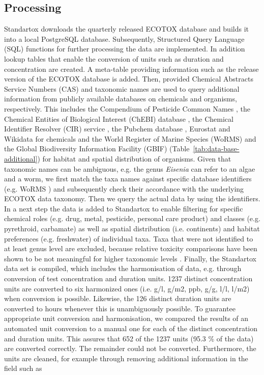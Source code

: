 \documentclass[journal,datadescriptor,submit,moreauthors,pdftex]{Definitions/mdpi}
\begin{document}
\subsection{Processing}
Standartox downloads the quarterly released ECOTOX database and builds it into a local PostgreSQL database. Subsequently, Structured Query Language (SQL) functions for further processing the data are implemented. In addition lookup tables that enable the conversion of units such as duration and concentration are created. A meta-table providing information such as the release version of the ECOTOX database is added. Then, provided Chemical Abstracts Service Numbers (CAS) and taxonomic names are used to query additional information from publicly available databases on chemicals and organisms, respectively. This includes the Compendium of Pesticide Common Names \citep{wood_compendium_2019}, the Chemical Entities of Biological Interest (ChEBI) database \citep{hastings_chebi_2016}, the Chemical Identifier Resolver (CIR) service \citep{nationalinstitutesofhealthnih_chemical_2019}, the Pubchem database \citep{kim_pubchem_2016}, Eurostat \citep{europeancommission_eurostat_2019} and Wikidata \citep{vrandecic_wikidata_2014} for chemicals and the World Register of Marine Species (WoRMS) \citep{wormseditorialboard_world_2020} and the Global Biodiversity Information Facility (GBIF) \citep{gbiftheglobalbiodiversityinformationfacility_what_2020} (Table~\ref{tab:data-base-additional}) for habitat and spatial distribution of organisms. Given that taxonomic names can be ambiguous, e.g. the genus \textit{Eisenia} can refer to an algae and a worm, we first match the taxa names against specific database identifiers (e.g. WoRMS \citep{wormseditorialboard_world_2020}) and subsequently check their accordance with the underlying ECOTOX data taxonomy. Then we query the actual data by using the identifiers. In a next step the data is added to Standartox to enable filtering for specific chemical roles (e.g. drug, metal, pesticide, personal care product) and classes (e.g. pyrethroid, carbamate) as well as spatial distribution (i.e. continents) and habitat preferences (e.g. freshwater) of individual taxa. Taxa that were not identified to at least genus level are excluded, because relative toxicity comparisons have been shown to be not meaningful for higher taxonomic levels \citep{rainbow_trace_2002, buchwalter_differences_2005, malaj_physiological_2012}. Finally, the Standartox data set is compiled, which includes the harmonisation of data, e.g. through conversion of test concentration and duration units. 1237 distinct concentration units are converted to six harmonized ones (i.e. g/l, g/m2, ppb, g/g, l/l, l/m2) when conversion is possible. Likewise, the 126 distinct duration units are converted to hours whenever this is unambiguously possible. To guarantee appropriate unit conversion and harmonisation, we compared the results of an automated unit conversion to a manual one for each of the distinct concentration and duration units. This assures that 652 of the 1237 units  (95.3 \% of the data) are converted correctly. The remainder could not be converted.  Furthermore, the units are cleaned, for example through removing additional information in the field such as 
\end{document}
